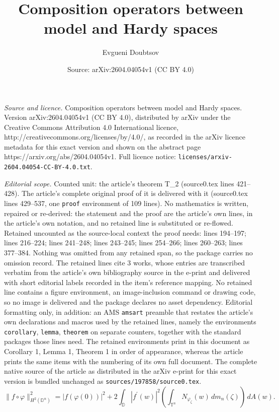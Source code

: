 \documentclass[10pt,a4paper]{amsart}
\title{Composition operators between model and Hardy spaces}
\author{Evgueni Doubtsov}
\date{Source: arXiv:2604.04054v1 (CC BY 4.0)}
\newcommand{\Dbb}{\mathbb D}
\newcommand{\aream}{A}
\newcommand{\dn}{\mathbb{D}^n}
\newcommand{\meal}{m_n}
\newcommand{\neva}{N}
\newcommand{\ph}{\varphi}
\newcommand{\tn}{\mathbb{T}^n}
\newcommand{\za}{\zeta}
\begin{document}
\maketitle

\noindent\emph{Source and licence.} Composition operators between model and Hardy spaces. Version arXiv:2604.04054v1 (CC BY 4.0), distributed by arXiv under the Creative Commons Attribution 4.0 International licence, http://creativecommons.org/licenses/by/4.0/, as recorded in the arXiv licence metadata for this exact version and shown on the abstract page https://arxiv.org/abs/2604.04054v1. Full licence notice: \texttt{licenses/arxiv-2604.04054-CC-BY-4.0.txt}.\par\smallskip

\noindent\textit{Editorial scope.} Counted unit: the article's theorem T\_2 (source0.tex lines 421--428). The article's complete original proof of it is delivered with it (source0.tex lines 429--537, one \texttt{proof} environment of 109 lines). No mathematics is written, repaired or re-derived: the statement and the proof are the article's own lines, in the article's own notation, and no retained line is substituted or re-flowed.  Retained uncounted as the source-local context the proof needs: lines 194--197; lines 216--224; lines 241--248; lines 243--245; lines 254--266; lines 260--263; lines 377--384.  Nothing was omitted from any retained span, so the package carries no omission record.  The retained lines cite 3 works, whose entries are transcribed verbatim from the article's own bibliography source in the e-print and delivered with short editorial labels recorded in the item's reference mapping.  No retained line contains a figure environment, an image-inclusion command or drawing code, so no image is delivered and the package declares no asset dependency.  Editorial formatting only, in addition: an AMS \texttt{amsart} preamble that restates the article's own declarations and macros used by the retained lines, namely the environments \texttt{corollary}, \texttt{lemma}, \texttt{theorem} on separate counters, together with the standard packages those lines need.  The retained environments print in this document as Corollary 1, Lemma 1, Theorem 1 in order of appearance, whereas the article prints the same items with the numbering of its own full document.  The complete native source of the article as distributed in the arXiv e-print for this exact version is bundled unchanged as \texttt{sources/197858/source0.tex}.
\begin{equation}\label{e_Stntn_d}
\|f\circ \ph\|^2_{H^2(\dn)} = |f(\ph(0))|^2 + 2\int_{\Dbb} |f^\prime(w)|^2
\left(\int_{\tn} \neva_{\ph_\za}(w)\,  d\meal(\za) \right)\, d\aream(w).
\end{equation}
\end{document}
